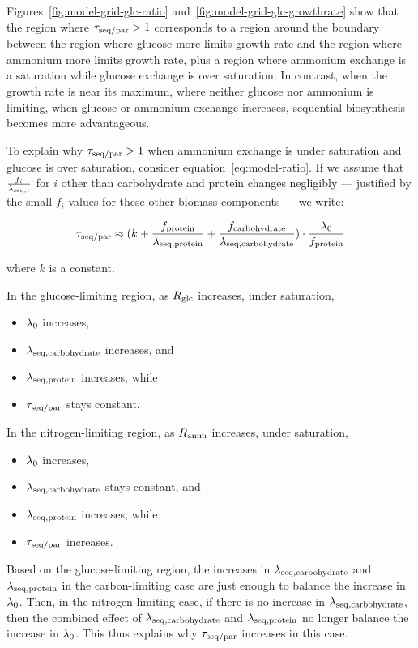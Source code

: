 Figures~\ref{fig:model-grid-glc-ratio} and~\ref{fig:model-grid-glc-growthrate} show that the region where $\tau_{\mathrm{seq}/\mathrm{par}} > 1$ corresponds to a region around the boundary between the region where glucose more limits growth rate and the region where ammonium more limits growth rate, plus a region where ammonium exchange is a saturation while glucose exchange is over saturation.
In contrast, when the growth rate is near its maximum, where neither glucose nor ammonium is limiting, when glucose or ammonium exchange increases, sequential biosynthesis becomes more advantageous.

To explain why $\tau_{\mathrm{seq}/\mathrm{par}} > 1$ when ammonium exchange is under saturation and glucose is over saturation, consider equation~\ref{eq:model-ratio}.
If we assume that $\frac{f_i}{\lambda_{\mathrm{seq},i}}$ for $i$ other than carbohydrate and protein changes negligibly --- justified by the small $f_{i}$ values for these other biomass components --- we write:

\begin{equation}
  \tau_{\mathrm{seq}/\mathrm{par}} \approx (k + \frac{f_{\mathrm{protein}}}{\lambda_{\mathrm{seq},\mathrm{protein}}} + \frac{f_{\mathrm{carbohydrate}}}{\lambda_{\mathrm{seq},\mathrm{carbohydrate}}}) \cdot \frac{\lambda_{0}}{f_{\mathrm{protein}}}
  \label{eq:model-ratio-assume}
\end{equation}

where $k$ is a constant.

In the glucose-limiting region, as $R_{\mathrm{glc}}$ increases, under saturation,
\begin{itemize}
  \item $\lambda_{0}$ increases,
  \item $\lambda_{\mathrm{seq},\mathrm{carbohydrate}}$ increases, and
  \item $\lambda_{\mathrm{seq},\mathrm{protein}}$ increases, while
  \item $\tau_{\mathrm{seq}/\mathrm{par}}$ stays constant.
\end{itemize}

In the nitrogen-limiting region, as $R_{\mathrm{amm}}$ increases, under saturation,
\begin{itemize}
  \item $\lambda_{0}$ increases,
  \item $\lambda_{\mathrm{seq},\mathrm{carbohydrate}}$ stays constant, and
  \item $\lambda_{\mathrm{seq},\mathrm{protein}}$ increases, while
  \item $\tau_{\mathrm{seq}/\mathrm{par}}$ increases.
\end{itemize}

Based on the glucose-limiting region, the increases in $\lambda_{\mathrm{seq},\mathrm{carbohydrate}}$ and $\lambda_{\mathrm{seq},\mathrm{protein}}$ in the carbon-limiting case are just enough to balance the increase in $\lambda_{0}$.
Then, in the nitrogen-limiting case, if there is no increase in $\lambda_{\mathrm{seq},\mathrm{carbohydrate}}$, then the combined effect of $\lambda_{\mathrm{seq},\mathrm{carbohydrate}}$ and $\lambda_{\mathrm{seq},\mathrm{protein}}$ no longer balance the increase in $\lambda_{0}$.
This thus explains why $\tau_{\mathrm{seq}/\mathrm{par}}$ increases in this case.

